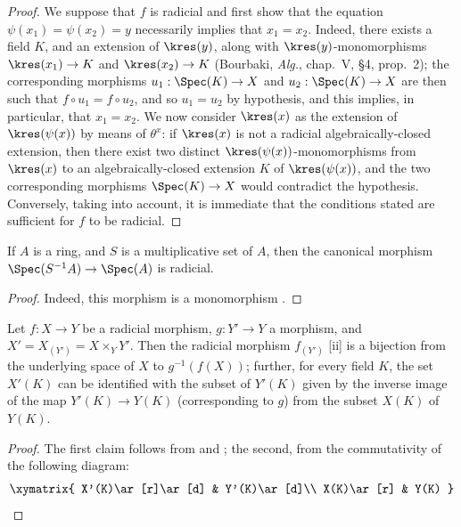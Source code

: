 \begin{proof}
We suppose that $f$ is radicial and first show that the equation $\psi(x_1)=\psi(x_2)=y$ necessarily implies that $x_1=x_2$.
Indeed, there exists a field $K$, and an extension of $\kres(y)$, along with $\kres(y)$-monomorphisms $\kres(x_1)\to K$ and $\kres(x_2)\to K$ (Bourbaki, \emph{Alg.}, chap.~V, §4, prop.~2); the corresponding morphisms $u_1:\Spec(K)\to X$ and $u_2:\Spec(K)\to X$ are then such that $f\circ u_1=f\circ u_2$, and so $u_1=u_2$ by hypothesis, and this implies, in particular, that $x_1=x_2$.
We now consider $\kres(x)$ as the extension of $\kres(\psi(x))$ by means of $\theta^x$: if $\kres(x)$ is not a radicial algebraically-closed extension, then there exist two distinct $\kres(\psi(x))$-monomorphisms from $\kres(x)$ to an algebraically-closed extension $K$ of $\kres(\psi(x))$, and the two corresponding morphisms $\Spec(K)\to X$ would contradict the hypothesis.
Conversely, taking  into account, it is immediate that the conditions stated are sufficient for $f$ to be radicial.
\end{proof}

\begin{corollary}[3.5.9]
\label{I.3.5.9}
If $A$ is a ring, and $S$ is a multiplicative set of $A$, then the canonical morphism $\Spec(S^{-1}A)\to\Spec(A)$ is radicial.
\end{corollary}

\begin{proof}
Indeed, this morphism is a monomorphism .
\end{proof}

\begin{corollary}[3.5.10]
\label{I.3.5.10}
Let $f:X\to Y$ be a radicial morphism, $g:Y'\to Y$ a morphism, and $X'=X_{(Y')}=X\times_Y Y'$.
Then the radicial morphism $f_{(Y')}$ [ii] is a bijection from the underlying space of $X$ to $g^{-1}(f(X))$; further, for every field $K$, the set $X'(K)$ can be identified with the subset of $Y'(K)$ given by the inverse image of the map $Y'(K)\to Y(K)$ (corresponding to $g$) from the subset $X(K)$ of $Y(K)$.
\end{corollary}

\begin{proof}
The first claim follows from  and ; the second, from the commutativity of the following diagram:
\[
  \xymatrix{
    X'(K)\ar[r]\ar[d] &
    Y'(K)\ar[d]\\
    X(K)\ar[r] &
    Y(K)
  }
\]
\end{proof}


